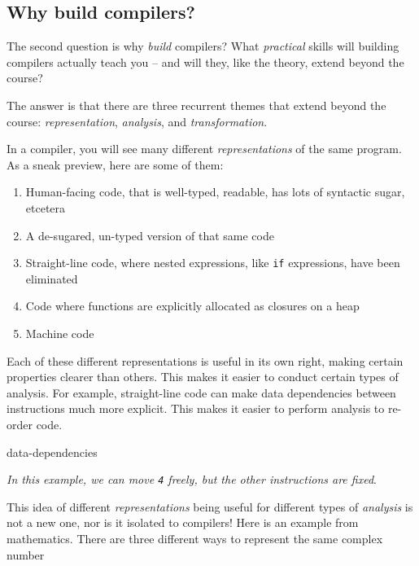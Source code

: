 \subsection{Why build compilers?}
The second question is why \emph{build} compilers? What \emph{practical} skills will building compilers actually teach you -- and will they, like the theory, extend beyond the course?

The answer is that there are three recurrent themes that extend beyond the course: \emph{representation}, \emph{analysis}, and \emph{transformation}. 

In a compiler, you will see many different \textit{representations} of the same program. As a sneak preview, here are some of them:

\begin{enumerate}
    \item Human-facing code, that is well-typed, readable, has lots of syntactic sugar, etcetera
    \item A de-sugared, un-typed version of that same code
    \item Straight-line code, where nested expressions, like \texttt{if} expressions, have been eliminated
    \item Code where functions are explicitly allocated as closures on a heap
    \item Machine code
\end{enumerate}

Each of these different representations is useful in its own right, making certain properties clearer than others. This makes it easier to conduct certain types of analysis. For example, straight-line code can make data dependencies between instructions much more explicit. This makes it easier to perform analysis to re-order code.

\begin{center}
    {data-dependencies}
\end{center}

\textit{In this example, we can move \textit{\texttt{4}} freely, but the other instructions are fixed}.

This idea of different \textit{representations} being useful for different types of \textit{analysis} is not a new one, nor is it isolated to compilers! Here is an example from mathematics. There are three different ways to represent the same complex number

